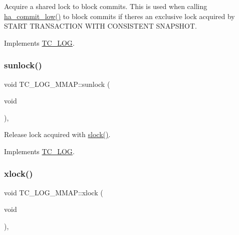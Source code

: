 Acquire a shared lock to block commits. This is used when calling \mbox{\hyperlink{handler_8cc_a4a77fdd0e1d6bee79e29e7495c7d752a}{ha\+\_\+commit\+\_\+low()}} to block commits if there\textquotesingle{}s an exclusive lock acquired by S\+T\+A\+RT T\+R\+A\+N\+S\+A\+C\+T\+I\+ON W\+I\+TH C\+O\+N\+S\+I\+S\+T\+E\+NT S\+N\+A\+P\+S\+H\+OT. 

Implements \mbox{\hyperlink{classTC__LOG_a5b73af1ad12c691b3417c565f7e58a1c}{T\+C\+\_\+\+L\+OG}}.

\mbox{\label{classTC__LOG__MMAP_a8f2d68fb0873cc813dcfc65d4d922261}} 
\subsubsection{\texorpdfstring{sunlock()}{sunlock()}}
{\footnotesize\ttfamily void T\+C\+\_\+\+L\+O\+G\+\_\+\+M\+M\+A\+P\+::sunlock (\begin{DoxyParamCaption}\item[{void}]{ }\end{DoxyParamCaption})\hspace{0.3cm}{\ttfamily [inline]}, {\ttfamily [virtual]}}

Release lock acquired with \mbox{\hyperlink{classTC__LOG__MMAP_a8c90387699139f5e9d244e60c5a126a1}{slock()}}. 

Implements \mbox{\hyperlink{classTC__LOG_ab383cdb4b722c9b11d284ac8b970b087}{T\+C\+\_\+\+L\+OG}}.

\mbox{\label{classTC__LOG__MMAP_ab6e8fad0d9b8167b22d22f4372739202}} 
\subsubsection{\texorpdfstring{xlock()}{xlock()}}
{\footnotesize\ttfamily void T\+C\+\_\+\+L\+O\+G\+\_\+\+M\+M\+A\+P\+::xlock (\begin{DoxyParamCaption}\item[{void}]{ }\end{DoxyParamCaption})\hspace{0.3cm}{\ttfamily [inline]}, {\ttfamily [virtual]}}

